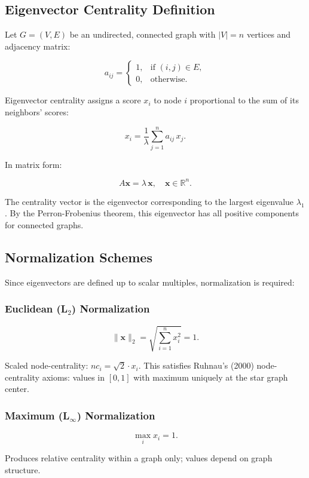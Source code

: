 \documentclass[12pt]{article}
\begin{document}
\subsection{Eigenvector Centrality Definition}

Let $G = (V, E)$ be an undirected, connected graph with $|V| = n$ vertices and adjacency matrix:

\[
a_{ij} = \begin{cases}
1, & \text{if } (i,j) \in E, \\
0, & \text{otherwise.}
\end{cases}
\]

Eigenvector centrality assigns a score $x_i$ to node $i$ proportional to the sum of its neighbors' scores:

\[
x_i = \frac{1}{\lambda} \sum_{j=1}^{n} a_{ij}\, x_j.
\]

In matrix form:

\[
A\mathbf{x} = \lambda\, \mathbf{x}, \quad \mathbf{x} \in \mathbb{R}^n.
\]

The centrality vector is the eigenvector corresponding to the largest eigenvalue $\lambda_1$. By the Perron-Frobenius theorem, this eigenvector has all positive components for connected graphs.

\subsection{Normalization Schemes}

Since eigenvectors are defined up to scalar multiples, normalization is required:

\subsubsection{Euclidean (L$_2$) Normalization}

\[
\|\mathbf{x}\|_2 = \sqrt{\sum_{i=1}^{n} x_i^2} = 1.
\]

Scaled node-centrality: $nc_i = \sqrt{2} \cdot x_i$. This satisfies Ruhnau's (2000) node-centrality axioms: values in $[0,1]$ with maximum uniquely at the star graph center.

\subsubsection{Maximum (L$_\infty$) Normalization}

\[
\max_i x_i = 1.
\]

Produces relative centrality within a graph only; values depend on graph structure.
\end{document}
